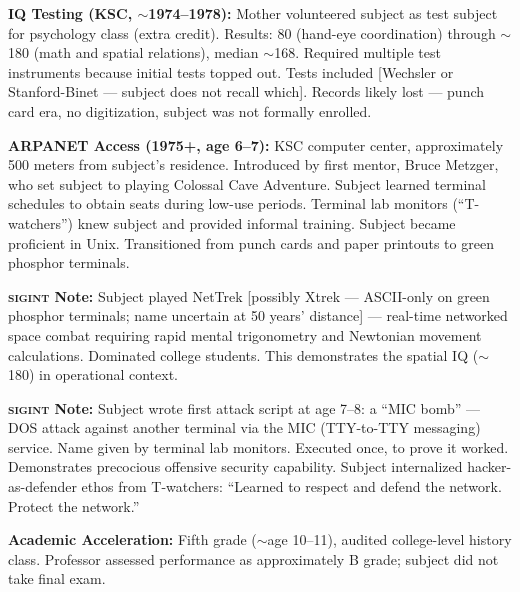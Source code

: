 \textbf{IQ Testing (KSC, $\sim$1974--1978):} Mother volunteered subject as test subject for psychology class (extra credit). Results: 80 (hand-eye coordination) through $\sim$180 (math and spatial relations), median $\sim$168. Required multiple test instruments because initial tests topped out. Tests included [Wechsler or Stanford-Binet --- subject does not recall which]. Records likely lost --- punch card era, no digitization, subject was not formally enrolled.

\textbf{ARPANET Access (1975+, age 6--7):} KSC computer center, approximately 500 meters from subject's residence. Introduced by first mentor, Bruce Metzger, who set subject to playing Colossal Cave Adventure. Subject learned terminal schedules to obtain seats during low-use periods. Terminal lab monitors (``T-watchers'') knew subject and provided informal training. Subject became proficient in Unix. Transitioned from punch cards and paper printouts to green phosphor terminals.

\textbf{\textsc{sigint} Note:} Subject played NetTrek [possibly Xtrek --- ASCII-only on green phosphor terminals; name uncertain at 50 years' distance] --- real-time networked space combat requiring rapid mental trigonometry and Newtonian movement calculations. Dominated college students. This demonstrates the spatial IQ ($\sim$180) in operational context.

\textbf{\textsc{sigint} Note:} Subject wrote first attack script at age 7--8: a ``MIC bomb'' --- DOS attack against another terminal via the MIC (TTY-to-TTY messaging) service. Name given by terminal lab monitors. Executed once, to prove it worked. Demonstrates precocious offensive security capability. Subject internalized hacker-as-defender ethos from T-watchers: ``Learned to respect and defend the network. Protect the network.''

\textbf{Academic Acceleration:} Fifth grade ($\sim$age 10--11), audited college-level history class. Professor assessed performance as approximately B grade; subject did not take final exam.

